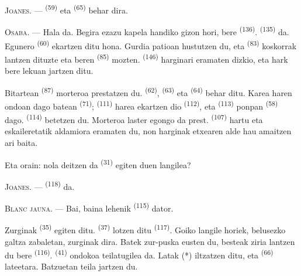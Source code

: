 \textsc{Joanes}. ---  \textsuperscript{(59)} eta
 \textsuperscript{(65)} behar dira.

\textsc{Osaba}. --- Hala da. Begira ezazu kapela handiko gizon hori, bere
 \textsuperscript{(136)}. 
\textsuperscript{(135)} da. Egunero 
\textsuperscript{(60)} ekartzen ditu hona. Gurdia patioan hustutzen du, eta
 \textsuperscript{(83)} koskorrak lantzen dituzte eta beren
 \textsuperscript{(85)} mozten. 
\textsuperscript{(146)} harginari eramaten dizkio, eta hark bere lekuan jartzen
ditu.

Bitartean  \textsuperscript{(87)} morteroa prestatzen du.
 \textsuperscript{(62)},  \textsuperscript{(63)} eta
 \textsuperscript{(64)} behar ditu. Karea haren ondoan dago
 batean \textsuperscript{(71)}; 
\textsuperscript{(111)} harea ekartzen dio 
\textsuperscript{(112)}, eta  \textsuperscript{(113)} ponpan
\textsuperscript{(58)} dago.  \textsuperscript{(114)} betetzen du.
Morteroa laster egongo da prest.  \textsuperscript{(107)} hartu
eta eskaileretatik aldamiora eramaten du, non harginak etxearen alde hau
amaitzen ari baita.

Eta orain: nola deitzen da  \textsuperscript{(31)} egiten duen
langilea?

\textsc{Joanes}. ---  \textsuperscript{(118)} da.

\VUsaut{3.0mm}
\VUsaut{3.0mm}

\textsc{Blanc jauna}. --- Bai, baina lehenik 
\textsuperscript{(115)} dator.

Zurginak  \textsuperscript{(35)} egiten ditu. 
\textsuperscript{(37)} lotzen ditu  \textsuperscript{(117)}. Goiko
langile horiek, belusezko galtza zabaletan, zurginak dira. Batek zur-puska
eusten du, besteak ziria lantzen du bere 
\textsuperscript{(116)}.  \textsuperscript{(41)} ondokoa
teilatugilea da. Latak  (*) iltzatzen ditu, eta
 \textsuperscript{(66)} lateetara. Batzuetan teila jartzen du.

